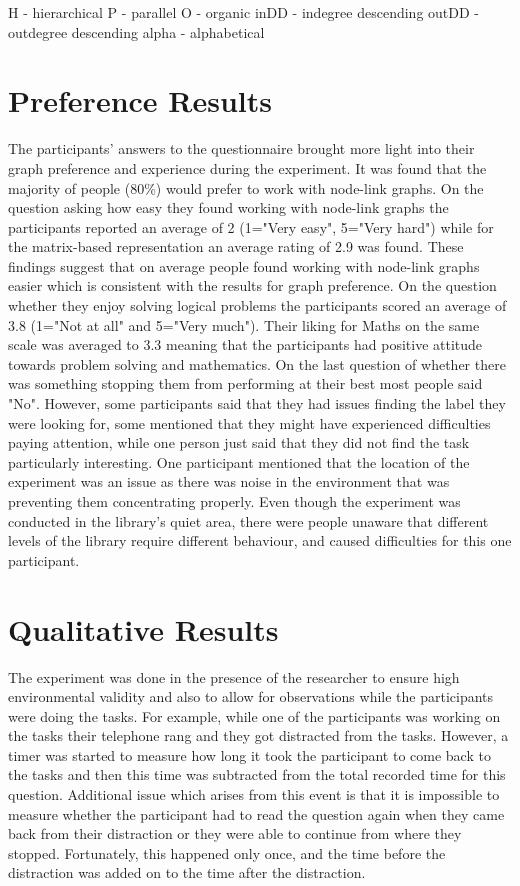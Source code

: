 \documentclass{l4proj}
\begin{document}
H - hierarchical P - parallel O - organic inDD - indegree descending outDD - outdegree descending alpha - alphabetical
\section{Preference Results} 

The participants' answers to the questionnaire brought more light into their graph preference and experience during the experiment. It was found that the majority of people (80\%) would prefer to work with node-link graphs. On the question asking how easy they found working with node-link graphs the participants reported an average of 2 (1="Very easy", 5="Very hard") while for the matrix-based representation an average rating of 2.9 was found. These findings suggest that on average people found working with node-link graphs easier which is consistent with the results for graph preference. On the question whether they enjoy solving logical problems the participants scored an average of 3.8 (1="Not at all" and 5="Very much"). Their liking for Maths on the same scale was averaged to 3.3 meaning that the participants had positive attitude towards problem solving and mathematics. On the last question of whether there was something stopping them from performing at their best most people said "No". However, some participants said that they had issues finding the label they were looking for, some mentioned that they might have experienced difficulties paying attention, while one person just said that they did not find the task particularly interesting. One participant mentioned that the location of the experiment was an issue as there was noise in the environment that was preventing them concentrating properly. Even though the experiment was conducted in the library's quiet area, there were people unaware that different levels of the library require different behaviour, and caused difficulties for this one participant.


\section{Qualitative Results}

The experiment was done in the presence of the researcher to ensure high environmental validity and also to allow for  observations while the participants were doing the tasks. For example, while one of the participants was working on the tasks their telephone rang and they got distracted from the tasks. However, a timer was started to measure how long it took the participant to come back to the tasks and then this time was subtracted from the total recorded time for this question. Additional issue which arises from this event is that it is impossible to measure whether the participant had to read the question again when they came back from their distraction or they were able to continue from where they stopped. Fortunately, this happened only once, and the time before the distraction was added on to the time after the distraction.
\end{document}
